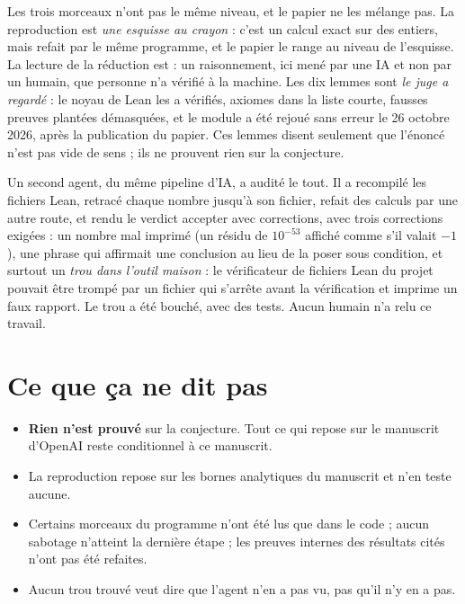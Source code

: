 Les trois morceaux n'ont pas le même niveau, et le papier ne les mélange pas.
La reproduction est  \emph{une esquisse au crayon} : c'est un calcul exact sur des entiers, mais refait par le même
programme, et le papier le range au niveau de l'esquisse. La lecture de la réduction est
 : un raisonnement, ici mené par une IA et non par un humain, que personne n'a vérifié
à la machine. Les dix lemmes sont  \emph{le juge a regardé} : le noyau de Lean les a vérifiés,
axiomes dans la liste courte, fausses preuves plantées démasquées, et le module a été rejoué sans
erreur le 26 octobre 2026, après la publication du papier. Ces lemmes disent seulement que
l'énoncé n'est pas vide de sens ; ils ne prouvent rien sur la conjecture.

Un second agent, du même pipeline d'IA, a audité le tout. Il a recompilé les fichiers Lean,
retracé chaque nombre jusqu'à son fichier, refait des calculs par une autre route, et rendu le
verdict \og accepter avec corrections\fg{}, avec trois corrections exigées : un nombre mal
imprimé (un résidu de $10^{-53}$ affiché comme s'il valait $-1$), une phrase qui affirmait une
conclusion au lieu de la poser sous condition, et surtout un \emph{trou dans l'outil maison} :
le vérificateur de fichiers Lean du projet pouvait être trompé par un fichier qui s'arrête
avant la vérification et imprime un faux rapport. Le trou a été bouché, avec des tests. Aucun
humain n'a relu ce travail.

\section*{Ce que ça ne dit pas}

\begin{limite}
\begin{itemize}
\item \textbf{Rien n'est prouvé} sur la conjecture. Tout ce qui repose sur le manuscrit d'OpenAI
  reste conditionnel à ce manuscrit.
\item La reproduction repose sur les bornes analytiques du manuscrit et n'en teste aucune.
\item Certains morceaux du programme n'ont été lus que dans le code ; aucun sabotage n'atteint
  la dernière étape ; les preuves internes des résultats cités n'ont pas été refaites.
\item \og Aucun trou trouvé\fg{} veut dire que l'agent n'en a pas vu, pas qu'il n'y en a pas.
\end{itemize}
\end{limite}

